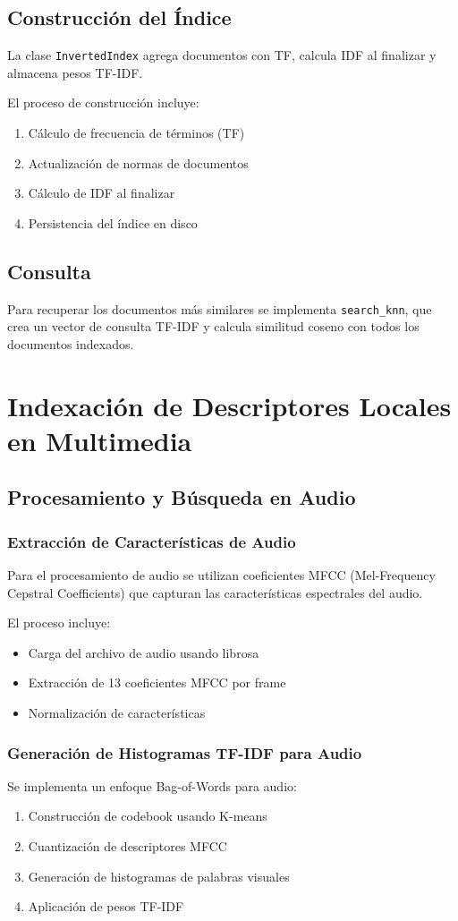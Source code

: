 \documentclass[a4paper,12pt]{report}
\begin{document}
\section{Construcción del Índice}
La clase \texttt{InvertedIndex} agrega documentos con TF, calcula IDF al finalizar y almacena pesos TF-IDF.

El proceso de construcción incluye:
\begin{enumerate}
\item Cálculo de frecuencia de términos (TF)
\item Actualización de normas de documentos
\item Cálculo de IDF al finalizar
\item Persistencia del índice en disco
\end{enumerate}

\section{Consulta}
Para recuperar los documentos más similares se implementa \texttt{search\_knn}, que crea un vector de consulta TF-IDF y calcula similitud coseno con todos los documentos indexados.

\chapter{Indexación de Descriptores Locales en Multimedia}
\section{Procesamiento y Búsqueda en Audio}
\subsection{Extracción de Características de Audio}
Para el procesamiento de audio se utilizan coeficientes MFCC (Mel-Frequency Cepstral Coefficients) que capturan las características espectrales del audio.

El proceso incluye:
\begin{itemize}
\item Carga del archivo de audio usando librosa
\item Extracción de 13 coeficientes MFCC por frame
\item Normalización de características
\end{itemize}

\subsection{Generación de Histogramas TF-IDF para Audio}
Se implementa un enfoque Bag-of-Words para audio:
\begin{enumerate}
\item Construcción de codebook usando K-means
\item Cuantización de descriptores MFCC
\item Generación de histogramas de palabras visuales
\item Aplicación de pesos TF-IDF
\end{enumerate}
\end{document}
